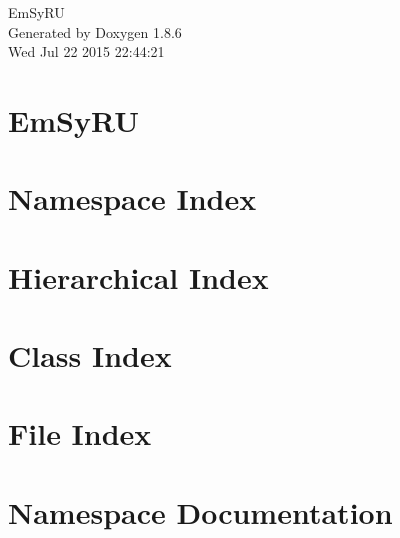 \documentclass[twoside]{book}
\newcommand{\clearemptydoublepage}{%
  \newpage{\pagestyle{empty}\cleardoublepage}%
}
\begin{document}
\hypersetup{pageanchor=false}
\begin{titlepage}
\vspace*{7cm}
\begin{center}%
{\Large Em\-Sy\-R\-U }\\
\vspace*{1cm}
{\large Generated by Doxygen 1.8.6}\\
\vspace*{0.5cm}
{\small Wed Jul 22 2015 22:44:21}\\
\end{center}
\end{titlepage}
\clearemptydoublepage
\tableofcontents
\clearemptydoublepage
{}
\hypersetup{pageanchor=true}

\chapter{Em\-Sy\-R\-U}
\label{md_README}
\hypertarget{md_README}{}

\chapter{Namespace Index}

\chapter{Hierarchical Index}

\chapter{Class Index}

\chapter{File Index}

\chapter{Namespace Documentation}

\end{document}
